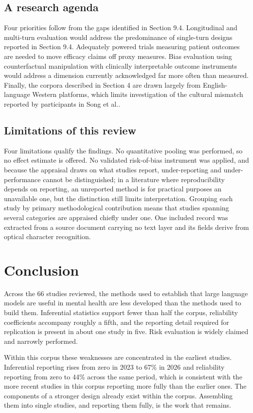 \documentclass[11pt]{article}
\begin{document}
	\subsection{A research agenda}
	
	Four priorities follow from the gaps identified in Section 9.4. Longitudinal and multi-turn
	evaluation would address the predominance of single-turn designs reported in Section 9.4. Adequately powered trials measuring patient outcomes are needed to move
	efficacy claims off proxy measures. Bias evaluation using counterfactual manipulation with
	clinically interpretable outcome instruments would address a dimension currently acknowledged far
	more often than measured. Finally, the corpora described in Section 4 are drawn largely from English-language Western
	platforms, which limits investigation of the cultural mismatch reported by participants in Song et
	al.\cite{song2025typingcureexperienceslarge}.
	
	\subsection{Limitations of this review}
	
	Four limitations qualify the findings. No quantitative pooling was performed, so no effect estimate
	is offered. No validated risk-of-bias instrument was applied, and because the appraisal draws on
	what studies report, under-reporting and under-performance cannot be distinguished; in a literature
	where reproducibility depends on reporting, an unreported method is for practical purposes an
	unavailable one, but the distinction still limits interpretation. Grouping each study by primary
	methodological contribution means that studies spanning several categories are appraised chiefly
	under one. One included record was extracted from a source document carrying no text layer and its
	fields derive from optical character recognition. 
	
	\section{Conclusion}
	
	Across the 66 studies reviewed, the methods used to establish that large language models are useful
	in mental health are less developed than the methods used to build them. Inferential statistics support fewer
	than half the corpus, reliability coefficients accompany roughly a fifth, and the reporting detail
	required for replication is present in about one study in five. Risk evaluation is widely claimed
	and narrowly performed.
	
	Within this corpus these weaknesses are concentrated in the earliest studies. Inferential reporting rises from
	zero in 2023 to 67\% in 2026 and reliability reporting from zero to 44\% across the same period,
	which is consistent with the more recent studies in this corpus reporting more fully than the
	earlier ones. The components of a stronger design already exist within the corpus.
	Assembling them into single studies, and reporting them fully, is the work that remains.
	
	
	
	
	
	
	
\end{document}
